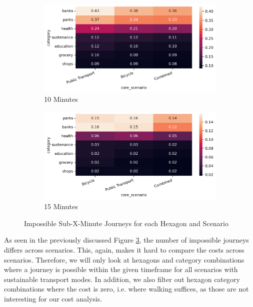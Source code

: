 \begin{figure}
  \centering
  \begin{subfigure}[b]{0.45\textwidth}
    \centering
    \includegraphics[width=\textwidth]{Figures/results/monthly_costs/percentage_inf_10.png}
    \caption{10 Minutes}
    \label{fig:percentage_inf_10}
  \end{subfigure}
  \hfill
  \begin{subfigure}[b]{0.45\textwidth}
    \centering
    \includegraphics[width=\textwidth]{Figures/results/monthly_costs/percentage_inf_15.png}
    \caption{15 Minutes}
    \label{fig:percentage_inf_15}
  \end{subfigure}
  \caption{Impossible Sub-X-Minute Journeys for each Hexagon and Scenario}
  \label{fig:percentage_inf_x}
\end{figure}

As seen in the previously discussed Figure \ref{fig:percentage_inf_x}, the number of impossible journeys differs across scenarios.
This, again, makes it hard to compare the costs across scenarios.
Therefore, we will only look at hexagons and category combinations where a journey is possible within the given timeframe for all scenarios with sustainable transport modes.
In addition, we also filter out hexagon category combinations where the cost is zero, i.e. where walking suffices, as those are not interesting for our cost analysis.

